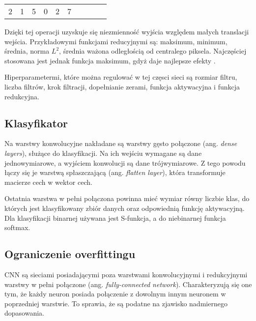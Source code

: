 \begin{table}[h]
\begin{tabular}{llllllllll}
\multicolumn{1}{|l|}{\cellcolor[HTML]{FFCB2F}2} & \multicolumn{1}{l|}{\cellcolor[HTML]{FFCB2F}1}  & \multicolumn{1}{l|}{\cellcolor[HTML]{FFCB2F}5} & \multicolumn{1}{l|}{\cellcolor[HTML]{32CB00}0} & \multicolumn{1}{l|}{\cellcolor[HTML]{32CB00}2} & \multicolumn{1}{l|}{\cellcolor[HTML]{32CB00}7} &  &                       &                                                 &                                                \\ \cline{1-6}
\end{tabular}
\end{table}

Dzięki tej operacji uzyskuje się niezmienność wyjścia względem małych translacji wejścia. Przykładowymi funkcjami reducyjnymi są: maksimum, minimum, średnia, norma \begin{math}L^{2}\end{math}, średnia ważona odległością od centralego piksela. Najczęściej stosowana jest jednak funkcja maksimum, gdyż daje najlepsze efekty \cite{Scherer2010EvaluationOP}.

Hiperparametermi, które można regulować w tej częsci sieci są rozmiar filtru, liczba filtrów, krok filtracji, dopełnianie zerami, funkcja aktywacyjna i funkcja redukcyjna.

\subsection{Klasyfikator}
Na warstwy konwolucyjne nakładane są warstwy gęsto połączone (ang. \textit{dense layers}), służące do klasyfikacji. Na  ich wejściu wymagane są dane jednowymiarowe, a wyjściem konwolucji są dane trójwymiarowe. Z tego powodu łączy się je warstwą spłaszczającą (ang. \textit{flatten layer}), która transformuje macierze cech w wektor cech.

Ostatnia warstwa w pełni połączona powinna mieć wymiar równy liczbie klas, do których jest klasyfikowany zbiór danych oraz odpowiednią funkcję aktywacyjną. Dla klasyfikacji binarnej używana jest S-funkcja, a do niebinarnej funkcja softmax.

\subsection{Ograniczenie overfittingu}
CNN są sieciami posiadającymi poza warstwami konwolucyjnymi i redukcyjnymi warstwy w pełni połączone (ang. \textit{fully-connected network}). Charakteryzują się one tym, że każdy neuron posiada połączenie z dowolnym innym neuronem w poprzedniej warstwie. To sprawia, że są podatne na zjawisko nadmiernego dopasowania. 

